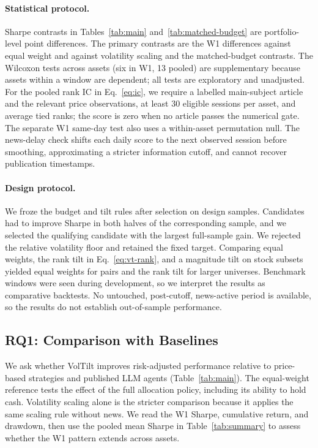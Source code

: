 \paragraph{Statistical protocol.}
Sharpe contrasts in Tables~\ref{tab:main} and~\ref{tab:matched-budget} are portfolio-level point differences. The primary contrasts are the W1 differences against equal weight and against volatility scaling and the matched-budget contrasts. The Wilcoxon tests across assets (six in W1, 13 pooled) are supplementary because assets within a window are dependent; all tests are exploratory and unadjusted. For the pooled rank IC in Eq.~\eqref{eq:ic}, we require a labelled main-subject article and the relevant price observations, at least 30 eligible sessions per asset, and average tied ranks; the score is zero when no article passes the numerical gate. The separate W1 same-day test also uses a within-asset permutation null. The news-delay check shifts each daily score to the next observed session before smoothing, approximating a stricter information cutoff, and cannot recover publication timestamps.

\paragraph{Design protocol.}
We froze the budget and tilt rules after selection on design samples. Candidates had to improve Sharpe in both halves of the corresponding sample, and we selected the qualifying candidate with the largest full-sample gain. We rejected the relative volatility floor and retained the fixed target. Comparing equal weights, the rank tilt in Eq.~\eqref{eq:vt-rank}, and a magnitude tilt on stock subsets yielded equal weights for pairs and the rank tilt for larger universes. Benchmark windows were seen during development, so we interpret the results as comparative backtests. No untouched, post-cutoff, news-active period is available, so the results do not establish out-of-sample performance.

\subsection{RQ1: Comparison with Baselines}
\label{sec:rq1}

We ask whether VolTilt improves risk-adjusted performance relative to price-based strategies and published LLM agents (Table~\ref{tab:main}). The equal-weight reference tests the effect of the full allocation policy, including its ability to hold cash. Volatility scaling alone is the stricter comparison because it applies the same scaling rule without news. We read the W1 Sharpe, cumulative return, and drawdown, then use the pooled mean Sharpe in Table~\ref{tab:summary} to assess whether the W1 pattern extends across assets.

